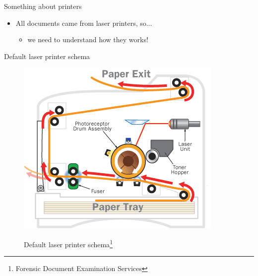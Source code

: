 \documentclass[notes]{beamer}
\begin{document}
\begin{frame}

\begin{block}{Something about printers}

\begin{itemize}

\item All documents came from laser printers, so...\pause

\begin{itemize}

\item we need to understand how they works!

\end{itemize}

\end{itemize}

\end{block}

\end{frame}

\begin{frame}

\begin{block}{Default laser printer schema}

\begin{figure}[!htb]
\centering
\includegraphics[scale=0.4]{page_printer}
\label{fig:page_printer}
\caption{Default laser printer schema\footnote{Forensic Document Examination Services\cite{Page_printer}}}
\end{figure}

\end{block}
{\let\thefootnote\relax\footnotetext{}}
\end{frame}
\end{document}
